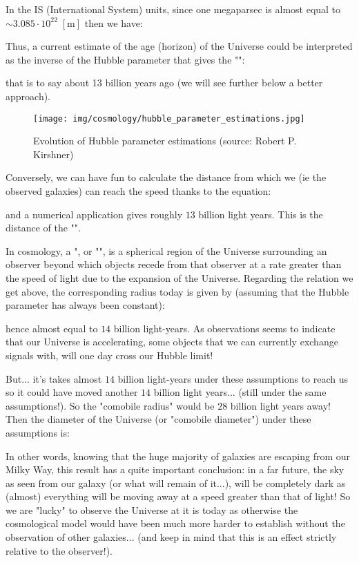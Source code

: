 	In the IS (International System) units, since one megaparsec is almost equal to $\sim 3.085\cdot 10^{22}\; [\text{m}]$ then we have:
	
	Thus, a current estimate of the age (horizon) of the Universe could be interpreted as the inverse of the Hubble parameter that gives the "":
	
	that is to say about 13 billion years ago (we will see further below a better approach).
	\begin{figure}[H]
		\centering
		\texttt{[image: img/cosmology/hubble\_parameter\_estimations.jpg]}	
		\caption[Evolution of Hubble parameter estimations]{Evolution of Hubble parameter estimations (source: Robert P. Kirshner)}
	\end{figure} 
	Conversely, we can have fun to calculate the distance from which we (ie the observed galaxies) can reach the speed  thanks to the equation:
	
	and a numerical application gives roughly $13$ billion light years. This is the distance of the "".
	
	In cosmology, a ", or "", is a spherical region of the Universe surrounding an observer beyond which objects recede from that observer at a rate greater than the speed of light due to the expansion of the Universe. Regarding the relation we get above, the corresponding radius today is given by (assuming that the Hubble parameter has always been constant):
	
	hence almost equal to $14$ billion light-years. As observations seems to indicate that our Universe is accelerating, some objects that we can currently exchange signals with, will one day cross our Hubble limit!
	
	But... it's takes almost $14$ billion light-years under these assumptions to reach us so it could have moved another $14$ billion light years... (still under the same assumptions!). So the "comobile radius" would be $28$ billion light years away! Then the diameter of the Universe (or "comobile diameter") under these assumptions is:
	
	
	In other words, knowing that the huge majority of galaxies are escaping from our Milky Way, this result has a quite important conclusion: in a far future, the sky as seen from our galaxy (or what will remain of it...), will be completely dark as (almost) everything will be moving away at a speed greater than that of light! So we are "lucky" to observe the Universe at it is today as otherwise the cosmological model would have been much more harder to establish without the observation of other galaxies... (and keep in mind that this is an effect strictly relative to the observer!).
	

